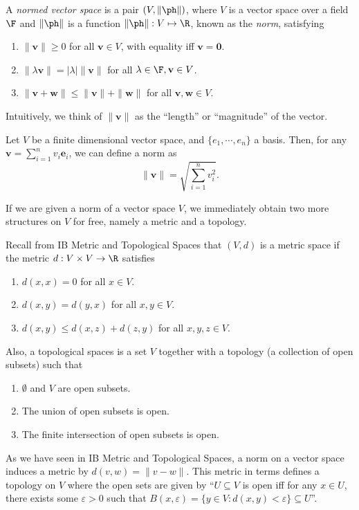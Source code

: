 \documentclass[a4paper]{article}
\begin{document}
\begin{defi}
  A \emph{normed vector space} is a pair $(V, \|\ph \|)$, where $V$ is a vector space over a field $\F$ and $\|\ph \|$ is a function $\|\ph \|: V \mapsto \R$, known as the \emph{norm}, satisfying
  \begin{enumerate}
    \item $\|\mathbf{v}\| \geq 0$ for all $\mathbf{v}\in V$, with equality iff $\mathbf{v} = \mathbf{0}$.
    \item $\| \lambda \mathbf{v}\| = |\lambda| \|\mathbf{v}\|$ for all $\lambda \in \F, \mathbf{v}\in V$.
    \item $\|\mathbf{v} + \mathbf{w}\| \leq \|\mathbf{v}\| + \|\mathbf{w}\|$ for all $\mathbf{v}, \mathbf{w} \in V$.
  \end{enumerate}
\end{defi}
Intuitively, we think of $\|\mathbf{v}\|$ as the ``length'' or ``magnitude'' of the vector.

\begin{eg}
  Let $V$ be a finite dimensional vector space, and $\{e_1, \cdots, e_n\}$ a basis. Then, for any $\mathbf{v} = \sum_{i = 1}^n v_i \mathbf{e}_i$, we can define a norm as
  \[
    \|\mathbf{v}\| = \sqrt{\sum_{i = 1}^n v_i^2}.
  \]
\end{eg}

If we are given a norm of a vector space $V$, we immediately obtain two more structures on $V$ for free, namely a metric and a topology.

Recall from IB Metric and Topological Spaces that $(V, d)$ is a metric space if the metric $d: V\times V \to \R$ satisfies
\begin{enumerate}
  \item $d(x, x) = 0$ for all $x\in V$.
  \item $d(x, y) = d(y, x)$ for all $x, y\in V$.
  \item $d(x, y) \leq d(x, z) + d(z, y)$ for all $x, y, z\in V$.
\end{enumerate}
Also, a topological spaces is a set $V$ together with a topology (a collection of open subsets) such that
\begin{enumerate}
  \item $\emptyset$ and $V$ are open subsets.
  \item The union of open subsets is open.
  \item The finite intersection of open subsets is open.
\end{enumerate}
As we have seen in IB Metric and Topological Spaces, a norm on a vector space induces a metric by $d(v, w) = \|v - w\|$. This metric in terms defines a topology on $V$ where the open sets are given by ``$U\subseteq V$ is open iff for any $x\in U$, there exists some $\varepsilon > 0$ such that $B(x, \varepsilon) = \{y\in V: d(x, y) < \varepsilon\}\subseteq U$''.
\end{document}
